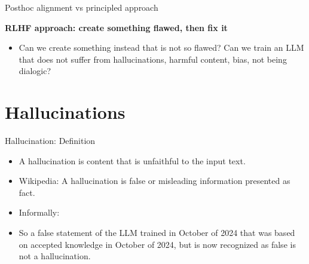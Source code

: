 \begin{vbframe}{Posthoc alignment vs principled approach}

\vfill

\textbf{RLHF approach: create something flawed, then fix it}

	\begin{itemize}
		\item \ques Can we create something instead that
		is not so flawed?
                Can we train an LLM that does not
		suffer from hallucinations, harmful content,
		bias, not being dialogic?
	\end{itemize}

\vfill

\end{vbframe}










\section{Hallucinations}

\begin{vbframe}{Hallucination: Definition}

\vfill


	\begin{itemize}
		\item
A hallucination is content that is unfaithful to the input text.
\href{https://aclanthology.org/2020.acl-main.173.pdf}{}
		\item
Wikipedia: A hallucination is false or misleading
		information presented as fact.
		\item
                Informally:
                \item So a false statement of the LLM
                trained in October of 2024 that
                was based on accepted knowledge in October
                of 2024, but is now recognized as false is not
                a hallucination.
	\end{itemize}

\vfill

\end{vbframe}

